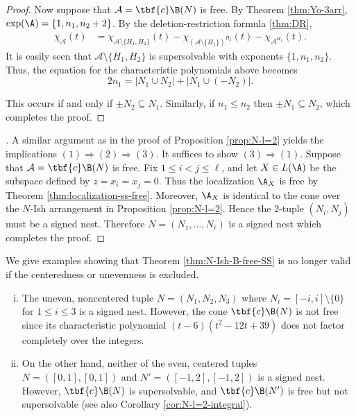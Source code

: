 \begin{proof}
Now suppose that $ \mathcal{A}=\tbf{c}\B(N)$ is free.
By Theorem \ref{thm:Yo-3arr}, $\exp(\A) = \{1,n_1,n_2+2\}$. 
By the deletion-restriction formula \ref{thm:DR}, 
\begin{align*}
{\chi}_\mathcal{A}(t)  & = {\chi}_{\mathcal{A} \setminus \{H_1,H_2\}}( t)-{\chi}_{(\mathcal{A} \setminus \{H_1\})^{H_2}} ( t)-{\chi}_{\mathcal{A}^{H_1}}( t).
\end{align*}
It is easily seen that $\mathcal{A} \setminus \{H_1,H_2\}$ is supersolvable with exponents $\{1, n_1,n_2\}$. 
Thus, the equation for the characteristic polynomials above becomes 
\begin{equation*}
 \label{eq:DO}
2n_1 = |N_1 \cup N_2| + |N_1 \cup (-N_2)|.
\end{equation*}

This occurs if and only if $\pm N_2 \subseteq N_1$. 
Similarly, if $n _1 \le n_2$ then $\pm N_1 \subseteq N_2$, which completes the proof.
\end{proof}


\begin{proof}[]
A similar argument as in the proof of Proposition \ref{prop:N-l=2} yields the implications $(1) \Rightarrow (2) \Rightarrow (3)$. It suffices to show $(3) \Rightarrow (1)$. 
Suppose that $ \mathcal{A}=\tbf{c}\B(N)$ is free. 
Fix $1 \leq i < j \leq \ell$, and let $X\in L(\A)$ be the subspace defined by $z=x_{i}=x_j=0$.  
Thus the localization $\A_X$ is free by Theorem \ref{thm:localization-ss-free}. 
Moreover, $\A_X$ is identical to the cone over the $N$-Ish arrangement in Proposition \ref{prop:N-l=2}. 
Hence the $2$-tuple $(N_i, N_j)$ must be a signed nest. 
Therefore $N = (N_1, \ldots, N_\ell)$ is a signed nest which completes the proof.
 \end{proof} 

  \begin{example}
\label{ex:NI-no}
We give examples showing that Theorem \ref{thm:N-Ish-B-free-SS} is no longer valid if the centeredness or unevenness is excluded.
 \begin{enumerate}[(i)]
\item The  uneven, noncentered tuple $N = (N_1,N_2,N_3)$ where $N_i =[-i,i]\setminus\{0\}$ for $1 \le i \le 3$ is a signed nest. 
However, the cone $\tbf{c}\B(N)$ is not free since its characteristic polynomial  $(t-6)(t^2-12t+39)$ does not factor completely over the integers.
\item On the other hand, neither of the even, centered tuples $N = ( [0,1] , [0,1] )$ and $N' = ( [-1,2] , [-1,2] )$ is a signed nest. 
However, $\tbf{c}\B(N)$ is supersolvable, and $\tbf{c}\B(N')$ is  free but not supersolvable (see also Corollary  \ref{cor:N-l=2-integral}). 
\end{enumerate}
\end{example}

